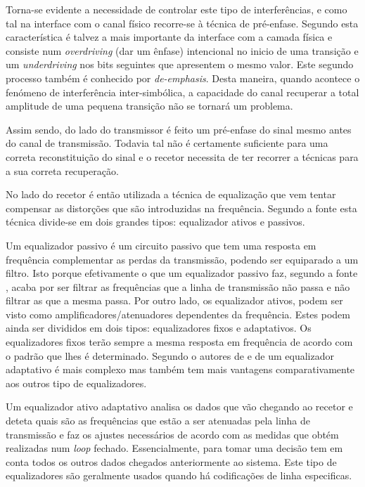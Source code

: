Torna-se evidente a necessidade de controlar este tipo de interferências, e como tal na interface com o canal físico recorre-se à técnica de pré-enfase. Segundo \cite{R032} esta característica é talvez a  mais importante da interface com a camada física e consiste num \textit{overdriving} (dar um ênfase) intencional no inicio de uma transição e um \textit{underdriving} nos bits seguintes que apresentem o mesmo valor. Este segundo processo também é conhecido por \textit{de-emphasis}. Desta maneira, quando acontece o fenómeno de interferência inter-simbólica, a capacidade do canal recuperar a total amplitude de uma pequena transição não se tornará um problema.

Assim sendo, do lado do transmissor é feito um pré-enfase do sinal mesmo antes do canal de transmissão. Todavia tal não é certamente suficiente para uma correta reconstituição do sinal e o recetor necessita de ter recorrer a técnicas para a sua correta recuperação.

No lado do recetor é então utilizada a técnica de equalização que vem tentar compensar as distorções que são introduzidas na frequência. Segundo a fonte \cite{R032} esta técnica divide-se em dois grandes tipos: equalizador ativos e passivos.

Um equalizador passivo é um circuito passivo que tem uma resposta em frequência complementar as perdas da transmissão, podendo ser equiparado a um filtro. Isto porque efetivamente o que um equalizador passivo faz, segundo a fonte \cite{R032}, acaba por ser filtrar as frequências que a linha de transmissão não passa e não filtrar as que a mesma passa. Por outro lado, os equalizador ativos, podem ser visto como amplificadores/atenuadores dependentes da frequência. Estes podem ainda ser divididos em dois tipos: equalizadores fixos e adaptativos. Os equalizadores fixos  terão sempre a mesma resposta em frequência de acordo com o padrão que lhes é determinado. Segundo o autores de \cite{R012} e de \cite{R032} um equalizador adaptativo é mais complexo mas também tem mais vantagens comparativamente aos outros tipo de equalizadores.

Um equalizador ativo adaptativo analisa os dados que vão chegando ao recetor e deteta quais são as frequências que estão a ser atenuadas pela linha de transmissão e faz os ajustes necessários de acordo com as medidas que obtém realizadas num \textit{loop} fechado. Essencialmente, para tomar uma decisão tem em conta todos os outros dados chegados anteriormente ao sistema. Este tipo de equalizadores são geralmente usados quando há codificações de linha especificas.
%

